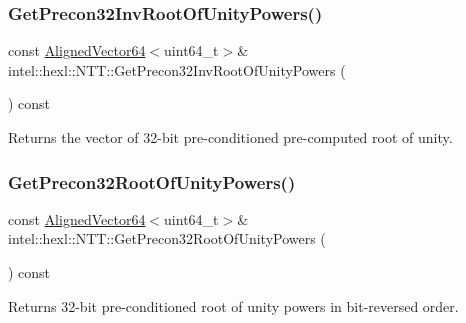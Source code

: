 \subsubsection{\texorpdfstring{Get\+Precon32\+Inv\+Root\+Of\+Unity\+Powers()}{GetPrecon32InvRootOfUnityPowers()}}
{\footnotesize\ttfamily const \hyperlink{namespaceintel_1_1hexl_afbdf0d2cc4209ee547a88ff22a02801b}{Aligned\+Vector64}$<$uint64\+\_\+t$>$\& intel\+::hexl\+::\+N\+T\+T\+::\+Get\+Precon32\+Inv\+Root\+Of\+Unity\+Powers (\begin{DoxyParamCaption}{ }\end{DoxyParamCaption}) const\hspace{0.3cm}{\ttfamily [inline]}}



Returns the vector of 32-\/bit pre-\/conditioned pre-\/computed root of unity. 

\mbox{\label{classintel_1_1hexl_1_1NTT_a1cbd65fb426faafbd22fcb8b7ee98807}} 
\subsubsection{\texorpdfstring{Get\+Precon32\+Root\+Of\+Unity\+Powers()}{GetPrecon32RootOfUnityPowers()}}
{\footnotesize\ttfamily const \hyperlink{namespaceintel_1_1hexl_afbdf0d2cc4209ee547a88ff22a02801b}{Aligned\+Vector64}$<$uint64\+\_\+t$>$\& intel\+::hexl\+::\+N\+T\+T\+::\+Get\+Precon32\+Root\+Of\+Unity\+Powers (\begin{DoxyParamCaption}{ }\end{DoxyParamCaption}) const\hspace{0.3cm}{\ttfamily [inline]}}



Returns 32-\/bit pre-\/conditioned root of unity powers in bit-\/reversed order. 

\mbox{\label{classintel_1_1hexl_1_1NTT_a9314e0edf36095233efaf72dc6cb9d5e}} 
